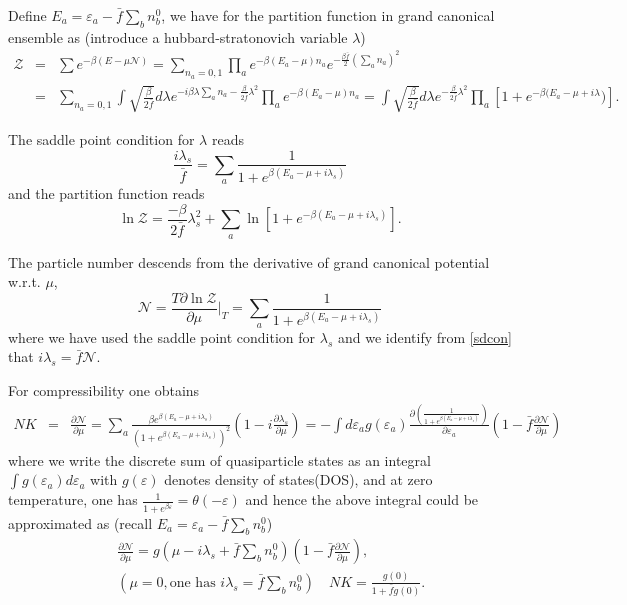 \documentclass[twocolumn,floatfix,superscriptaddress]{revtex4-1}
\begin{document}
\begin{widetext}
Define $E_a=\varepsilon_a-\bar f\sum_b n_b ^0$, we have for the partition function in grand canonical ensemble as (introduce a hubbard-stratonovich variable $\lambda$)
\begin{eqnarray}
\mathcal Z&=& \sum e^{-\beta(E-\mu \mathcal N)}=\sum_{n_a=0,1} \prod_a e^{-\beta(E_a-\mu)n_a}e^{-\frac{\beta\bar f}{2}(\sum_a n_a)^2}\nonumber\\
&=&\sum_{n_a=0,1} \int \sqrt{\frac{\beta}{2\bar f}} d\lambda e^{-i\beta \lambda\sum_a n_a-\frac{\beta}{2\bar f}\lambda^2}\prod_a e^{-\beta(E_a-\mu)n_a}=\int \sqrt{\frac{\beta}{2\bar f}} d\lambda e^{-\frac{\beta}{2\bar f}\lambda^2}\prod_a [1+e^{-\beta(E_a-\mu+i\lambda})].
\end{eqnarray}

The saddle point condition for $\lambda$ reads
\begin{equation}
\label{sdcon}
\frac{i\lambda_s}{\bar f}=\sum_a \frac{1}{1+e^{\beta (E_a-\mu+i\lambda_s)}}
\end{equation}
and the partition function reads
\begin{equation}
\ln \mathcal Z=\frac{-\beta}{2\bar f}\lambda_s^2+\sum_a \ln[1+e^{-\beta (E_a-\mu+i\lambda_s)}].
\end{equation}

The particle number descends from the derivative of grand canonical potential w.r.t. $\mu$,
\begin{equation}
\mathcal N=\frac{T\partial \ln \mathcal Z}{\partial \mu}\Big |_T=\sum_a \frac{1}{1+e^{\beta (E_a-\mu+i\lambda_s)}}
\end{equation}
where we have used the saddle point condition for $\lambda_s$ and we identify from \eqref{sdcon} that $i\lambda_s=\bar f\mathcal N$.

For compressibility one obtains
\begin{eqnarray}
NK&=&\frac{\partial \mathcal N}{\partial \mu}=\sum_a \frac{\beta e^{\beta(E_a-\mu+i\lambda_s)}}{(1+e^{\beta (E_a-\mu+i\lambda_s)})^2}(1-i\frac{\partial \lambda_s}{\partial \mu})=-\int d\varepsilon_a g(\varepsilon_a) \frac{\partial (\frac{1}{1+e^{\beta(E_a-\mu+i\lambda_s)}})}{\partial \varepsilon_a}(1-\bar f\frac{\partial \mathcal N}{\partial \mu})
\end{eqnarray}
where we write the discrete sum of quasiparticle states as an integral $\int g(\varepsilon_a)d\varepsilon_a$ with $g(\varepsilon)$ denotes density of states(DOS), and at zero temperature, one has $\frac{1}{1+e^{\beta \varepsilon}}=\theta(-\varepsilon)$ and hence the above integral could be approximated as  (recall $E_a=\varepsilon_a-\bar f\sum_b n_b^0$)
\begin{eqnarray}
\label{comre}
&&\frac{\partial \mathcal N}{\partial \mu}=g(\mu-i\lambda_s+\bar f \sum_b n_b^0)(1-\bar f \frac{\partial \mathcal N}{\partial \mu}),\nonumber\\
&& (\mu=0, \text{one has } i\lambda_s=\bar f \sum_b n_b^0)\quad NK=\frac{g(0)}{1+\bar fg(0)}.
\end{eqnarray}


\end{widetext}
\end{document}
